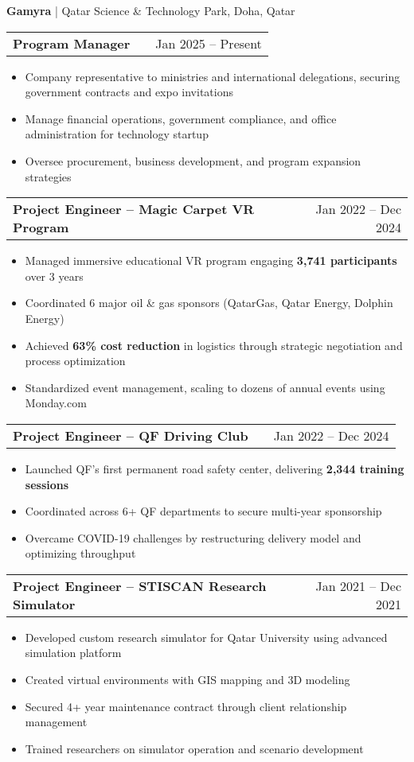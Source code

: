 \documentclass[a4paper,12pt]{article}
\makeatletter
\newenvironment{joblong}[2]
    {
    \begin{tabularx}{\linewidth}{@{}l X r@{}}
    \textbf{#1} & \hfill &  #2 \\[3.75pt]
    \end{tabularx}
    \begin{minipage}[t]{\linewidth}
    \begin{itemize}[nosep,after=\strut, leftmargin=1em, itemsep=3pt,label=--]
    }
    {
    \end{itemize}
    \end{minipage}
    }
\makeatother
\begin{document}
\textbf{Gamyra} | Qatar Science \& Technology Park, Doha, Qatar

\begin{joblong}{Program Manager}{Jan 2025 -- Present}
\item Company representative to ministries and international delegations, securing government contracts and expo invitations
\item Manage financial operations, government compliance, and office administration for technology startup
\item Oversee procurement, business development, and program expansion strategies
\end{joblong}

\begin{joblong}{Project Engineer -- Magic Carpet VR Program}{Jan 2022 -- Dec 2024}
\item Managed immersive educational VR program engaging \textbf{3,741 participants} over 3 years
\item Coordinated 6 major oil \& gas sponsors (QatarGas, Qatar Energy, Dolphin Energy)
\item Achieved \textbf{63\% cost reduction} in logistics through strategic negotiation and process optimization
\item Standardized event management, scaling to dozens of annual events using Monday.com
\end{joblong}

\begin{joblong}{Project Engineer -- QF Driving Club}{Jan 2022 -- Dec 2024}
\item Launched QF's first permanent road safety center, delivering \textbf{2,344 training sessions}
\item Coordinated across 6+ QF departments to secure multi-year sponsorship
\item Overcame COVID-19 challenges by restructuring delivery model and optimizing throughput
\end{joblong}

\begin{joblong}{Project Engineer -- STISCAN Research Simulator}{Jan 2021 -- Dec 2021}
\item Developed custom research simulator for Qatar University using advanced simulation platform
\item Created virtual environments with GIS mapping and 3D modeling
\item Secured 4+ year maintenance contract through client relationship management
\item Trained researchers on simulator operation and scenario development
\end{joblong}
\end{document}
